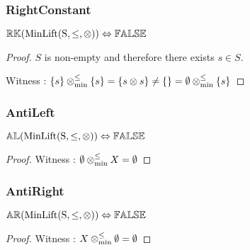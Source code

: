 \documentclass[../Summary.tex]{subfiles}
\begin{document}
\subsubsection{RightConstant}

\begin{theorem} \label{thm:minlift_rk}
${\mathbb{RK}}(\mathrm{MinLift(S,\leq,\otimes)}) \Leftrightarrow {\mathbb{FALSE}}$
\end{theorem}

\begin{proof}

\vspace{0.5em}

$S$ is non-empty and therefore there exists $s \in S$.

\vspace{0.5em}

Witness : $\{s\} \mathbin{\otimes_{\min}^{\leq}} \{s\} = \{s \otimes s\} \neq \{\} = \emptyset \mathbin{\otimes_{\min}^{\leq}} \{s\}$
\end{proof}




\subsubsection{AntiLeft}

\begin{theorem} \label{thm:minlift_al}
${\mathbb{AL}}(\mathrm{MinLift(S,\leq,\otimes)}) \Leftrightarrow {\mathbb{FALSE}}$
\end{theorem}

\begin{proof}

\vspace{0.5em}

Witness : $\emptyset \mathbin{\otimes_{\min}^{\leq}} X = \emptyset$
\end{proof}




\subsubsection{AntiRight}

\begin{theorem} \label{thm:minlift_ar}
${\mathbb{AR}}(\mathrm{MinLift(S,\leq,\otimes)}) \Leftrightarrow {\mathbb{FALSE}}$
\end{theorem}

\begin{proof}

\vspace{0.5em}

Witness : $X \mathbin{\otimes_{\min}^{\leq}} \emptyset = \emptyset$
\end{proof}
\end{document}
